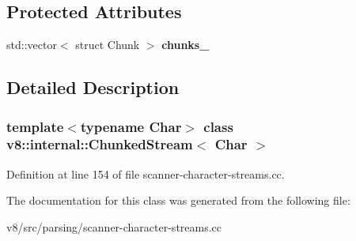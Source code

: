 \subsection*{Protected Attributes}
\begin{DoxyCompactItemize}
\item 
\mbox{\label{classv8_1_1internal_1_1ChunkedStream_ab0f67510268767ff96ecca088ffdd20f}} 
std\+::vector$<$ struct Chunk $>$ {\bfseries chunks\+\_\+}
\end{DoxyCompactItemize}


\subsection{Detailed Description}
\subsubsection*{template$<$typename Char$>$\newline
class v8\+::internal\+::\+Chunked\+Stream$<$ Char $>$}



Definition at line 154 of file scanner-\/character-\/streams.\+cc.



The documentation for this class was generated from the following file\+:\begin{DoxyCompactItemize}
\item 
v8/src/parsing/scanner-\/character-\/streams.\+cc\end{DoxyCompactItemize}
